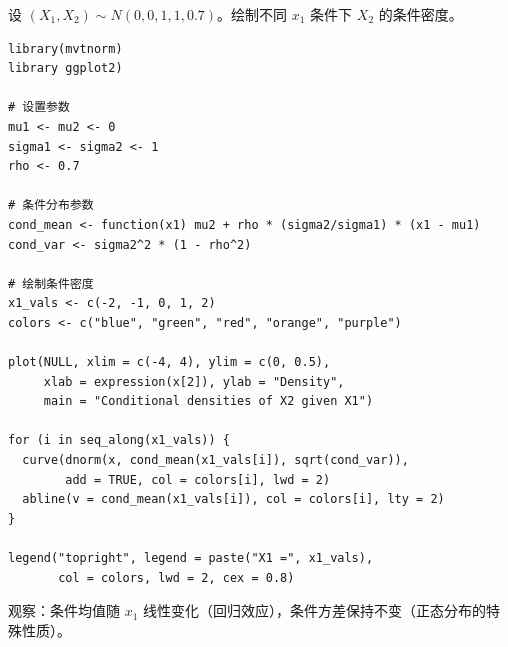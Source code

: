 \begin{example}[二元正态条件分布可视化]\label{ex:bivariate-normal-conditional-visualization-ch2}
设 $(X_1, X_2) \sim N(0, 0, 1, 1, 0.7)$。绘制不同 $x_1$ 条件下 $X_2$ 的条件密度。

\begin{verbatim}
library(mvtnorm)
library ggplot2)

# 设置参数
mu1 <- mu2 <- 0
sigma1 <- sigma2 <- 1
rho <- 0.7

# 条件分布参数
cond_mean <- function(x1) mu2 + rho * (sigma2/sigma1) * (x1 - mu1)
cond_var <- sigma2^2 * (1 - rho^2)

# 绘制条件密度
x1_vals <- c(-2, -1, 0, 1, 2)
colors <- c("blue", "green", "red", "orange", "purple")

plot(NULL, xlim = c(-4, 4), ylim = c(0, 0.5),
     xlab = expression(x[2]), ylab = "Density",
     main = "Conditional densities of X2 given X1")

for (i in seq_along(x1_vals)) {
  curve(dnorm(x, cond_mean(x1_vals[i]), sqrt(cond_var)),
        add = TRUE, col = colors[i], lwd = 2)
  abline(v = cond_mean(x1_vals[i]), col = colors[i], lty = 2)
}

legend("topright", legend = paste("X1 =", x1_vals),
       col = colors, lwd = 2, cex = 0.8)
\end{verbatim}

观察：条件均值随 $x_1$ 线性变化（回归效应），条件方差保持不变（正态分布的特殊性质）。
\end{example}

